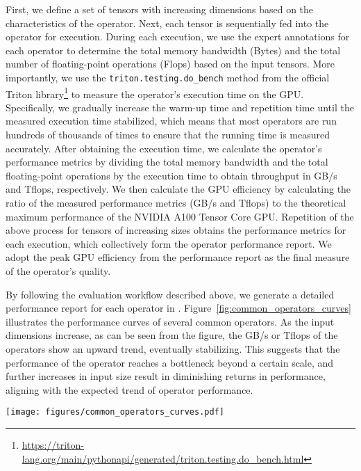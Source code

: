 First, we define a set of tensors with increasing dimensions based on the characteristics of the operator. 
Next, each tensor is sequentially fed into the operator for execution. 
During each execution, we use the expert annotations for each operator to determine the total memory bandwidth (Bytes) and the total number of floating-point operations (Flops) based on the input tensors.
More importantly, we use the \texttt{triton.testing.do\_bench} method from the official Triton library\footnote{\href{https://triton-lang.org/main/python-api/generated/triton.testing.do_bench.html}{https://triton-lang.org/main/pythonapi/generated/triton.testing.do\_bench.html}} to measure the operator’s execution time on the GPU. 
Specifically, we gradually increase the warm-up time and repetition time until the measured execution time stabilized, which means that most operators are run hundreds of thousands of times to ensure that the running time is measured accurately.
After obtaining the execution time, we calculate the operator’s performance metrics by dividing the total memory bandwidth and the total floating-point operations by the execution time to obtain throughput in GB/s and Tflops, respectively. 
We then calculate the GPU efficiency by calculating the ratio of the measured performance metrics (GB/s and Tflops) to the theoretical maximum performance of the NVIDIA A100 Tensor Core GPU.
Repetition of the above process for tensors of increasing sizes obtains the performance metrics for each execution, which collectively form the operator performance report.
We adopt the peak GPU efficiency from the performance report as the final measure of the operator's quality.

By following the evaluation workflow described above, we generate a detailed performance report for each operator in \benchone. Figure~\ref{fig:common_operators_curves} illustrates the performance curves of several common operators. As the input dimensions increase, as can be seen from the figure, the GB/s or Tflops of the operators show an upward trend, eventually stabilizing. 
This suggests that the performance of the operator reaches a bottleneck beyond a certain scale, and further increases in input size result in diminishing returns in performance, aligning with the expected trend of operator performance.

\begin{figure*}
    \centering
    \texttt{[image: figures/common\_operators\_curves.pdf]}
    \caption{Performance Curves of Common Operators}
    \label{fig:common_operators_curves}
\end{figure*}

